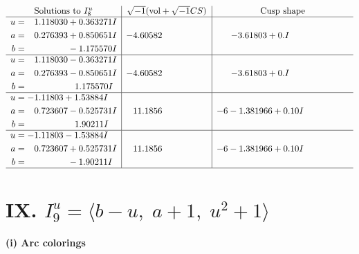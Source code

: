\documentclass[1p]{elsarticle_modified}
\theoremstyle{definition}
\newcommand{\I}{\sqrt{-1}}
\begin{document}
$$\begin{array}{c|c|c}  
\text{Solutions to }I^u_{8}& \I (\text{vol} + \sqrt{-1}CS) & \text{Cusp shape}\\
 \hline 
\begin{aligned}
u &= \phantom{-}1.118030 + 0.363271 I \\
a &= \phantom{-}0.276393 + 0.850651 I \\
b &= \phantom{-0.000000 } -1.175570 I\end{aligned}
 & -4.60582\phantom{ +0.000000I} & -3.61803 + 0. I\phantom{ +0.000000I} \\ \hline\begin{aligned}
u &= \phantom{-}1.118030 - 0.363271 I \\
a &= \phantom{-}0.276393 - 0.850651 I \\
b &= \phantom{-0.000000 -}1.175570 I\end{aligned}
 & -4.60582\phantom{ +0.000000I} & -3.61803 + 0. I\phantom{ +0.000000I} \\ \hline\begin{aligned}
u &= -1.11803 + 1.53884 I \\
a &= \phantom{-}0.723607 - 0.525731 I \\
b &= \phantom{-0.000000 -}1.90211 I\end{aligned}
 & \phantom{-}11.1856\phantom{ +0.000000I} &                  -6
-1.381966 + 0. 10   I\phantom{ +0.000000I} \\ \hline\begin{aligned}
u &= -1.11803 - 1.53884 I \\
a &= \phantom{-}0.723607 + 0.525731 I \\
b &= \phantom{-0.000000 } -1.90211 I\end{aligned}
 & \phantom{-}11.1856\phantom{ +0.000000I} &                  -6
-1.381966 + 0. 10   I\phantom{ +0.000000I}\\
 \hline 
 \end{array}$$\newpage\newpage\renewcommand{\arraystretch}{1}
\centering \section*{IX. $I^u_{9}= \langle b- u,\;a+1,\;u^2+1 \rangle$}
\flushleft \textbf{(i) Arc colorings}\\
\end{document}

